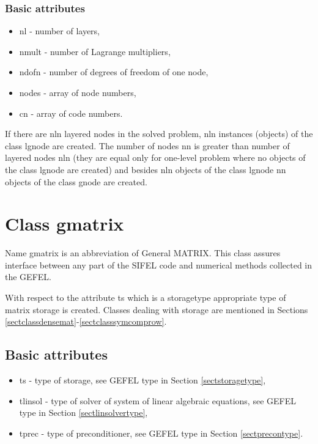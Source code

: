 \subsection{Basic attributes}
\begin{itemize}
\item{{\sf nl} - number of layers,}
\item{{\sf nmult} - number of Lagrange multipliers,}
\item{{\sf ndofn} - number of degrees of freedom of one node,}
\item{{\sf nodes} - array of node numbers,}
\item{{\sf cn} - array of code numbers.}
\end{itemize}
If there are {\sf nln} layered nodes in the solved problem, {\sf nln} instances (objects) of the class {\sf lgnode} are created.
The number of nodes {\sf nn} is greater than number of layered nodes {\sf nln} (they are equal only for one-level problem
where no objects of the class {\sf lgnode} are created) and besides {\sf nln} objects of the class {\sf lgnode} {\sf nn} objects of
the class {\sf gnode} are created.
\chapter{Class {\sf gmatrix}}

Name {\sf gmatrix} is an abbreviation of General MATRIX. This class assures interface between
any part of the SIFEL code and numerical methods collected in the GEFEL.

With respect to the attribute {\sf ts} which is a {\sf storagetype} appropriate
type of matrix storage is created. Classes dealing with storage are mentioned in Sections
\ref{sectclassdensemat}-\ref{sectclasssymcomprow}.

\section{Basic attributes}
\begin{itemize}
\item{{\sf ts} - type of storage, see GEFEL type in Section \ref{sectstoragetype},}
\item{{\sf tlinsol} - type of solver of system of linear algebraic equations, see GEFEL type in Section \ref{sectlinsolvertype},}
\item{{\sf tprec} - type of preconditioner, see GEFEL type in Section \ref{sectprecontype}.}
\end{itemize}

